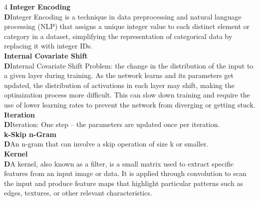 \documentclass[8pt]{extarticle}
\newcommand{\dtag}{\textcolor{definitioncolor}{\tiny\textbf{D}}\;}
\begin{document}
\begin{multicols}{4}
\vspace{2pt}\textbf{Integer Encoding}\\
\dtag Integer Encoding is a technique in data preprocessing and natural language processing (NLP) that assigns a unique integer value to each distinct element or category in a dataset, simplifying the representation of categorical data by replacing it with integer IDs.\\
\vspace{2pt}\textbf{Internal Covariate Shift}\\
\dtag Internal Covariate Shift Problem: the change in the distribution of the input to a given layer during training. As the network learns and its parameters get updated, the distribution of activations in each layer may shift, making the optimization process more difficult. This can slow down training and require the use of lower learning rates to prevent the network from diverging or getting stuck.\\
\vspace{2pt}\textbf{Iteration}\\
\dtag Iteration: One step -- the parameters are updated once per iteration.\\
\vspace{2pt}\textbf{k-Skip n-Gram}\\
\dtag An n-gram that can involve a skip operation of size k or smaller.\\
\vspace{2pt}\textbf{Kernel}\\
\dtag A kernel, also known as a filter, is a small matrix used to extract specific features from an input image or data. It is applied through convolution to scan the input and produce feature maps that highlight particular patterns such as edges, textures, or other relevant characteristics.\\


\end{multicols}
\end{document}
